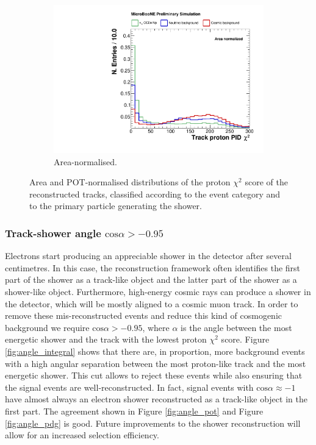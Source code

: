 \begin{figure}[htbp]
\begin{subfigure}{0.49\textwidth}
    \includegraphics[width=\linewidth]{figures/h_track_pidchipr_norm.pdf}
    \caption{Area-normalised.} \label{fig:proton_norm}
  \end{subfigure}
  \caption{Area and POT-normalised distributions of the proton $\chi^2$ score of the reconstructed tracks, classified according to the event category and to the primary particle generating the shower.}\label{fig:proton_bkg}
\end{figure}

\subsubsection*{Track-shower angle $\mathrm{cos}\alpha > -0.95$}
Electrons start producing an appreciable shower in the detector after several centimetres. In this case, the reconstruction framework often identifies the first part of the shower as a track-like object and the latter part of the shower as a shower-like object. 
Furthermore, high-energy cosmic rays can produce a shower in the detector, which will be mostly aligned to a cosmic muon track. In order to remove these mis-reconstructed events and reduce this kind of cosmogenic background we require $\mathrm{cos}\alpha > -0.95$, where $\alpha$ is the angle between the most energetic shower and the track with the lowest proton $\chi^2$ score.
Figure \ref{fig:angle_integral} shows that there are, in proportion, more background events with a high angular separation between the most proton-like track and the most energetic shower. This cut allows to reject these events while also ensuring that the signal events are well-reconstructed. In fact, signal events with $\mathrm{cos}\alpha \approx -1$ have almost always an electron shower reconstructed as a track-like object in the first part. The agreement shown in Figure \ref{fig:angle_pot} and Figure \ref{fig:angle_pdg} is good. Future improvements to the shower reconstruction will allow for an increased selection efficiency.

